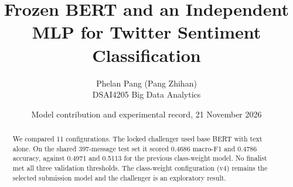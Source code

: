 \documentclass[11pt,a4paper]{article}
\title{Frozen BERT and an Independent MLP for Twitter Sentiment Classification}
\author{Phelan Pang (Pang Zhihan)\\DSAI4205 Big Data Analytics}
\date{Model contribution and experimental record, 21 November 2026}
\begin{document}
\maketitle
\begin{abstract}
We compared 11 configurations. The locked challenger used base BERT with text alone. On the shared 397-message test set it scored 0.4686 macro-F1 and 0.4786 accuracy, against 0.4971 and 0.5113 for the previous class-weight model. No finalist met all three validation thresholds. The class-weight configuration (v4) remains the selected submission model and the challenger is an exploratory result.
\end{abstract}


\end{document}
